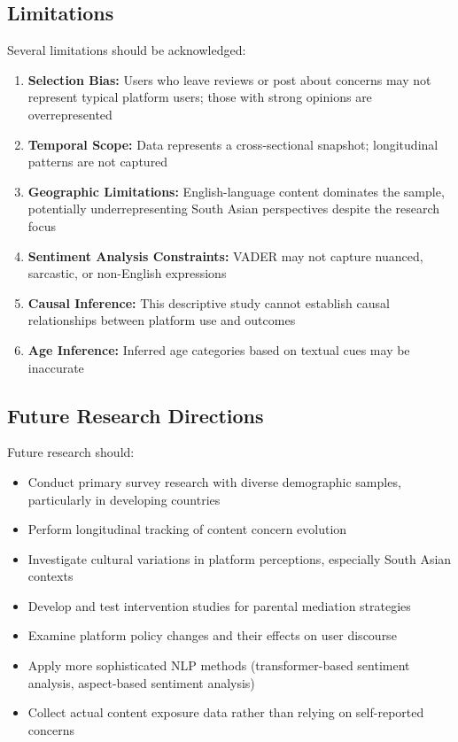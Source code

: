 \documentclass[12pt,a4paper]{article}
\begin{document}
\subsection{Limitations}

Several limitations should be acknowledged:

\begin{enumerate}[leftmargin=*, itemsep=0.3em]
    \item \textbf{Selection Bias:} Users who leave reviews or post about concerns may not represent typical platform users; those with strong opinions are overrepresented
    \item \textbf{Temporal Scope:} Data represents a cross-sectional snapshot; longitudinal patterns are not captured
    \item \textbf{Geographic Limitations:} English-language content dominates the sample, potentially underrepresenting South Asian perspectives despite the research focus
    \item \textbf{Sentiment Analysis Constraints:} VADER may not capture nuanced, sarcastic, or non-English expressions
    \item \textbf{Causal Inference:} This descriptive study cannot establish causal relationships between platform use and outcomes
    \item \textbf{Age Inference:} Inferred age categories based on textual cues may be inaccurate
\end{enumerate}

\subsection{Future Research Directions}

Future research should:

\begin{itemize}[leftmargin=*, itemsep=0.3em]
    \item Conduct primary survey research with diverse demographic samples, particularly in developing countries
    \item Perform longitudinal tracking of content concern evolution
    \item Investigate cultural variations in platform perceptions, especially South Asian contexts
    \item Develop and test intervention studies for parental mediation strategies
    \item Examine platform policy changes and their effects on user discourse
    \item Apply more sophisticated NLP methods (transformer-based sentiment analysis, aspect-based sentiment analysis)
    \item Collect actual content exposure data rather than relying on self-reported concerns
\end{itemize}
\end{document}
